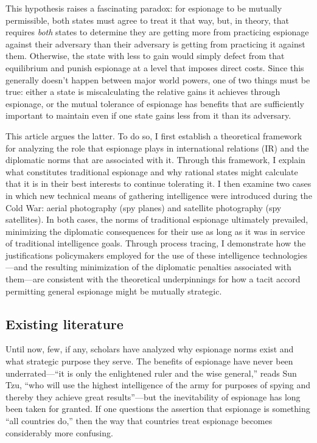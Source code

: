 \documentclass[14pt]{extarticle}
\begin{document}
This hypothesis raises a fascinating paradox: for espionage to be mutually permissible, both states must agree to treat it that way, but, in theory, that requires \emph{both} states to determine they are getting more from practicing espionage against their adversary than their adversary is getting from practicing it against them. Otherwise, the state with less to gain would simply defect from that equilibrium and punish espionage at a level that imposes direct costs. Since this generally doesn't happen between major world powers, one of two things must be true: either a state is miscalculating the relative gains it achieves through espionage, or the mutual tolerance of espionage has benefits that are sufficiently important to maintain even if one state gains less from it than its adversary.

This article argues the latter. To do so, I first establish a theoretical framework for analyzing the role that espionage plays in international relations (IR) and the diplomatic norms that are associated with it. Through this framework, I explain what constitutes traditional espionage and why rational states might calculate that it is in their best interests to continue tolerating it. I then examine two cases in which new technical means of gathering intelligence were introduced during the Cold War: aerial photography (spy planes) and satellite photography (spy satellites). In both cases, the norms of traditional espionage ultimately prevailed, minimizing the diplomatic consequences for their use as long as it was in service of traditional intelligence goals. Through process tracing, I demonstrate how the justifications policymakers employed for the use of these intelligence technologies---and the resulting minimization of the diplomatic penalties associated with them---are consistent with the theoretical underpinnings for how a tacit accord permitting general espionage might be mutually strategic.

\subsection{Existing literature}
Until now, few, if any, scholars have analyzed why espionage norms exist and what strategic purpose they serve. The benefits of espionage have never been underrated---\enquote{it is only the enlightened ruler and the wise general,} reads Sun Tzu, \enquote{who will use the highest intelligence of the army for purposes of spying and thereby they achieve great results}---but the inevitability of espionage has long been taken for granted. If one questions the assertion that espionage is something \enquote{all countries do,} then the way that countries treat espionage becomes considerably more confusing.
\end{document}
